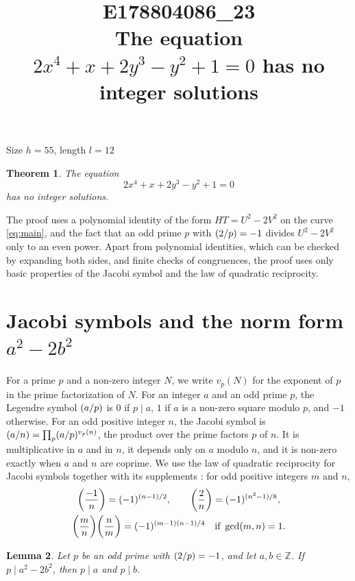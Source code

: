 \documentclass[11pt]{article}
\title{\textbf{E178804086\_23}\\[4pt] {\Large The equation $2x^{4}+x+2y^{3}-y^{2}+1=0$ has no integer solutions}}
\author{}
\date{}
\newtheorem{theorem}{Theorem}
\newtheorem{lemma}[theorem]{Lemma}
\newcommand{\Z}{\mathbb{Z}}
\newcommand{\leg}[2]{\mathchoice{\biggl(\dfrac{#1}{#2}\biggr)}{(#1/#2)}{(#1/#2)}{(#1/#2)}}
\begin{document}
\maketitle
\vspace{-8ex}
\begin{center}
Size $h=55$, length $l=12$
\end{center}

\begin{theorem}\label{thm:main}
The equation
\begin{equation}\label{eq:main}
2x^{4}+x+2y^{3}-y^{2}+1=0
\end{equation}
has no integer solutions.
\end{theorem}

The proof uses a polynomial identity of the form $HT=U^2-2V^2$ on the curve \eqref{eq:main}, and the fact that an odd prime $p$ with $\leg{2}{p}=-1$ divides $U^2-2V^2$ only to an even power. Apart from polynomial identities, which can be checked by expanding both sides, and finite checks of congruences, the proof uses only basic properties of the Jacobi symbol and the law of quadratic reciprocity.

\section{\texorpdfstring{Jacobi symbols and the norm form $a^2-2b^2$}{Jacobi symbols and the norm form}}

For a prime $p$ and a non-zero integer $N$, we write $v_p(N)$ for the exponent of $p$ in the prime factorization of $N$. For an integer $a$ and an odd prime $p$, the Legendre symbol $\leg{a}{p}$ is $0$ if $p\mid a$, $1$ if $a$ is a non-zero square modulo $p$, and $-1$ otherwise. For an odd positive integer $n$, the Jacobi symbol is $\leg{a}{n}=\prod_p\leg{a}{p}^{v_p(n)}$, the product over the prime factors $p$ of $n$. It is multiplicative in $a$ and in $n$, it depends only on $a$ modulo $n$, and it is non-zero exactly when $a$ and $n$ are coprime. We use the law of quadratic reciprocity for Jacobi symbols together with its supplements \cite[Chapter~5, \S2]{IR}: for odd positive integers $m$ and $n$,
\begin{gather*}
\leg{-1}{n}=(-1)^{(n-1)/2},\qquad\leg{2}{n}=(-1)^{(n^2-1)/8},\\
\leg{m}{n}\leg{n}{m}=(-1)^{(m-1)(n-1)/4}\quad\text{if }\gcd(m,n)=1.
\end{gather*}

\begin{lemma}\label{lem:divides}
Let $p$ be an odd prime with $\leg{2}{p}=-1$, and let $a,b\in\Z$. If $p\mid a^2-2b^2$, then $p\mid a$ and $p\mid b$.
\end{lemma}
\end{document}

